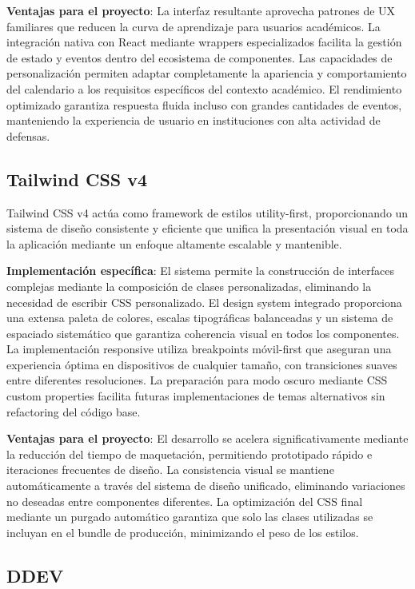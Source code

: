 \documentclass[12pt,a4paper,oneside]{report}
\begin{document}
\textbf{Ventajas para el proyecto}: La interfaz resultante aprovecha patrones de UX familiares que reducen la curva de aprendizaje para usuarios académicos. La integración nativa con React mediante wrappers especializados facilita la gestión de estado y eventos dentro del ecosistema de componentes. Las capacidades de personalización permiten adaptar completamente la apariencia y comportamiento del calendario a los requisitos específicos del contexto académico. El rendimiento optimizado garantiza respuesta fluida incluso con grandes cantidades de eventos, manteniendo la experiencia de usuario en instituciones con alta actividad de defensas.

\subsection{Tailwind CSS v4}\label{tailwind-css-v4}

Tailwind CSS v4 actúa como framework de estilos utility-first, proporcionando un sistema de diseño consistente y eficiente que unifica la presentación visual en toda la aplicación mediante un enfoque altamente escalable y mantenible.

\textbf{Implementación específica}: El sistema permite la construcción de interfaces complejas mediante la composición de clases personalizadas, eliminando la necesidad de escribir CSS personalizado. El design system integrado proporciona una extensa paleta de colores, escalas tipográficas balanceadas y un sistema de espaciado sistemático que garantiza coherencia visual en todos los componentes. La implementación responsive utiliza breakpoints móvil-first que aseguran una experiencia óptima en dispositivos de cualquier tamaño, con transiciones suaves entre diferentes resoluciones. La preparación para modo oscuro mediante CSS custom properties facilita futuras implementaciones de temas alternativos sin refactoring del código base.

\textbf{Ventajas para el proyecto}: El desarrollo se acelera significativamente mediante la reducción del tiempo de maquetación, permitiendo prototipado rápido e iteraciones frecuentes de diseño. La consistencia visual se mantiene automáticamente a través del sistema de diseño unificado, eliminando variaciones no deseadas entre componentes diferentes. La optimización del CSS final mediante un purgado automático garantiza que solo las clases utilizadas se incluyan en el bundle de producción, minimizando el peso de los estilos.

\subsection{DDEV}\label{ddev}
\end{document}
